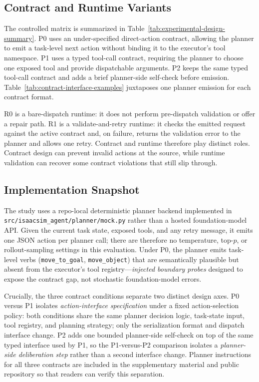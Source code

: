 \subsection{Contract and Runtime Variants}

The controlled matrix is summarized in Table~\ref{tab:experimental-design-summary}.
P0 uses an under-specified direct-action contract, allowing the planner to
emit a task-level next action without binding it to the executor's tool
namespace. P1 uses a typed tool-call contract, requiring the planner to
choose one exposed tool and provide dispatchable arguments. P2 keeps the same
typed tool-call contract and adds a brief planner-side self-check before
emission. Table~\ref{tab:contract-interface-examples} juxtaposes one planner
emission for each contract format.

R0 is a bare-dispatch runtime: it does not perform pre-dispatch validation or
offer a repair path. R1 is a validate-and-retry runtime: it checks the
emitted request against the active contract and, on failure, returns the
validation error to the planner and allows one retry. Contract and runtime
therefore play distinct roles. Contract design can prevent invalid actions at
the source, while runtime validation can recover some contract violations that
still slip through.



\subsection{Implementation Snapshot}

The study uses a repo-local deterministic planner backend implemented in
\texttt{src/isaacsim\_agent/planner/mock.py} rather than a hosted
foundation-model API. Given the current task state, exposed tools, and any
retry message, it emits one JSON action per planner call; there are therefore
no temperature, top-$p$, or rollout-sampling settings in this evaluation.
Under P0, the planner emits task-level verbs (\texttt{move\_to\_goal},
\texttt{move\_object}) that are semantically plausible but absent from the
executor's tool registry---\emph{injected boundary probes} designed to
expose the contract gap, not stochastic foundation-model errors.

Crucially, the three contract conditions separate two distinct design
axes. P0 versus P1 isolates \emph{action-interface specification}
under a fixed action-selection policy: both conditions share the same
planner decision logic, task-state input, tool registry, and planning
strategy; only the serialization format and dispatch interface change.
P2 adds one bounded planner-side self-check on top of the same typed
interface used by P1, so the P1-versus-P2 comparison isolates a
\emph{planner-side deliberation step} rather than a second interface
change.
Planner instructions for all three contracts are included in the
supplementary material and public repository so that readers can verify
this separation.


